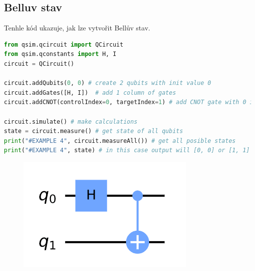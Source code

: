 \documentclass[11pt]{article}
\begin{document}
\subsection{Belluv stav}
Tenhle kód ukazuje, jak lze vytvořit Bellův stav.
\begin{lstlisting}[language=Python, caption=Bell state]
from qsim.qcircuit import QCircuit
from qsim.qconstants import H, I
circuit = QCircuit()

circuit.addQubits(0, 0) # create 2 qubits with init value 0
circuit.addGates([H, I])  # add 1 column of gates
circuit.addCNOT(controlIndex=0, targetIndex=1) # add CNOT gate with 0 index qubit as control and 1 index as target

circuit.simulate() # make calculations
state = circuit.measure() # get state of all qubits
print("#EXAMPLE 4", circuit.measureAll()) # get all posible states
print("#EXAMPLE 4", state) # in this case output will [0, 0] or [1, 1] with probability of 0.5
\end{lstlisting}
\begin{figure}[H]
    \includegraphics[scale=.5]{bell_state_scheme}
    \centering
\end{figure}
\end{document}
